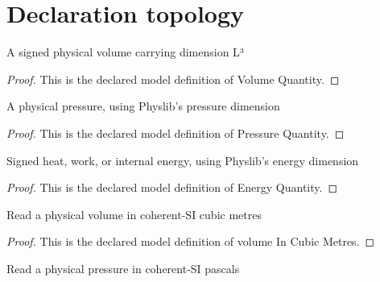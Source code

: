 \section{Declaration topology}
\begin{definition}
  \label{def:physics:phyx-mini-0471:phyxminiproblems-problemphyxmini0471-volumequantity}
  A signed physical volume carrying dimension L³
\end{definition}
\begin{proof}
  This is the declared model definition of Volume Quantity.
\end{proof}
\begin{definition}
  \label{def:physics:phyx-mini-0471:phyxminiproblems-problemphyxmini0471-pressurequantity}
  A physical pressure, using Physlib's pressure dimension
\end{definition}
\begin{proof}
  This is the declared model definition of Pressure Quantity.
\end{proof}
\begin{definition}
  \label{def:physics:phyx-mini-0471:phyxminiproblems-problemphyxmini0471-energyquantity}
  Signed heat, work, or internal energy, using Physlib's energy dimension
\end{definition}
\begin{proof}
  This is the declared model definition of Energy Quantity.
\end{proof}
\begin{definition}
  \label{def:physics:phyx-mini-0471:phyxminiproblems-problemphyxmini0471-volumeincubicmetres}
  Read a physical volume in coherent-SI cubic metres
\end{definition}
\begin{proof}
  This is the declared model definition of volume In Cubic Metres.
\end{proof}
\begin{definition}
  \label{def:physics:phyx-mini-0471:phyxminiproblems-problemphyxmini0471-pressureinpascals}
  Read a physical pressure in coherent-SI pascals
\end{definition}
